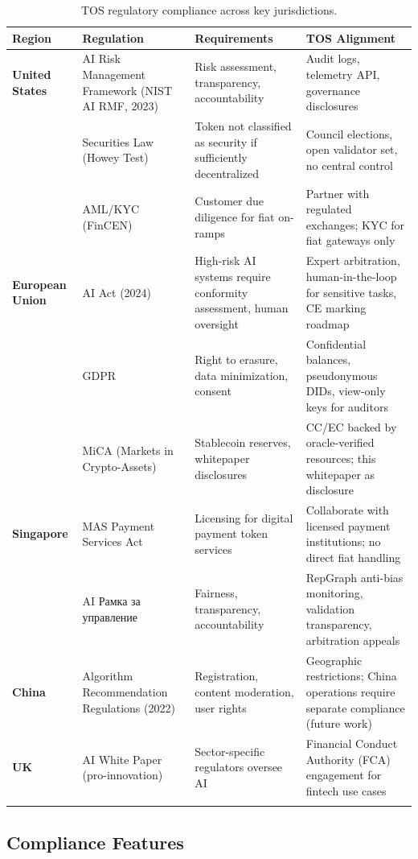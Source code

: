 \documentclass[11pt]{article}
\begin{document}
\begin{longtable}{@{}p{}p{}p{}p{}@{}}
\toprule
\textbf{Region} & \textbf{Regulation} & \textbf{Requirements} & \textbf{TOS Alignment} \\\midrule
\textbf{United States} & AI Risk Management Framework (NIST AI RMF, 2023) & Risk assessment, transparency, accountability & Audit logs, telemetry API, governance disclosures \\
 & Securities Law (Howey Test) & Token not classified as security if sufficiently decentralized & Council elections, open validator set, no central control \\
 & AML/KYC (FinCEN) & Customer due diligence for fiat on-ramps & Partner with regulated exchanges; KYC for fiat gateways only \\
\textbf{European Union} & AI Act (2024) & High-risk AI systems require conformity assessment, human oversight & Expert arbitration, human-in-the-loop for sensitive tasks, CE marking roadmap \\
 & GDPR & Right to erasure, data minimization, consent & Confidential balances, pseudonymous DIDs, view-only keys for auditors \\
 & MiCA (Markets in Crypto-Assets) & Stablecoin reserves, whitepaper disclosures & CC/EC backed by oracle-verified resources; this whitepaper as disclosure \\
\textbf{Singapore} & MAS Payment Services Act & Licensing for digital payment token services & Collaborate with licensed payment institutions; no direct fiat handling \\
 & AI Рамка за управление & Fairness, transparency, accountability & RepGraph anti-bias monitoring, validation transparency, arbitration appeals \\
\textbf{China} & Algorithm Recommendation Regulations (2022) & Registration, content moderation, user rights & Geographic restrictions; China operations require separate compliance (future work) \\
\textbf{UK} & AI White Paper (pro-innovation) & Sector-specific regulators oversee AI & Financial Conduct Authority (FCA) engagement for fintech use cases \\
\bottomrule
\caption{TOS regulatory compliance across key jurisdictions.}
\end{longtable}

\subsection{Compliance Features}
\end{document}
